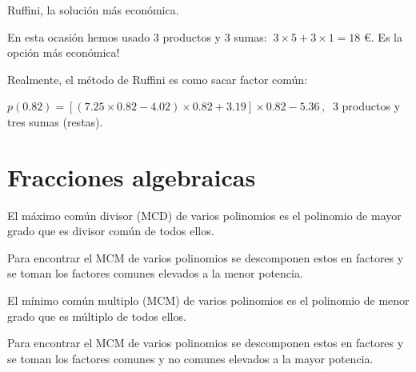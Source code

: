 \begin{myexampleblock}{Ruffini, la solución más económica.}
\begin{multicols}{2}
En esta ocasión hemos usado 3 productos y 3 sumas: $\ 3\times 5 + 3\times 1 = 18 $ \euro. Es la opción más económica!
\end{multicols}

Realmente, el método de Ruffini es como sacar factor común:

$p(0.82)=\left[ \left( 7.25 \times 0.82 - 4.02 \right) \times 0.82 + 3.19 \right] \times 0.82 - 5.36 \, , \ $ 3 productos y tres sumas (restas).

\end{myexampleblock}


\vspace{1cm}
\section{Fracciones algebraicas}
\vspace{0.5cm}



\begin{definition}

\vspace{2mm} El máximo común divisor (MCD) de varios polinomios es el polinomio de mayor grado que es divisor común de todos ellos. 

\vspace{2mm} Para encontrar el MCM de varios polinomios se descomponen estos en factores y se toman los factores comunes elevados a la menor potencia.


\vspace{4mm} El mínimo común multiplo (MCM) de varios polinomios es el polinomio de menor grado que es múltiplo de todos ellos.

\vspace{2mm} Para encontrar el MCM de varios polinomios se descomponen estos en factores y se toman los factores comunes y no comunes elevados a la mayor potencia.
	
\end{definition}

